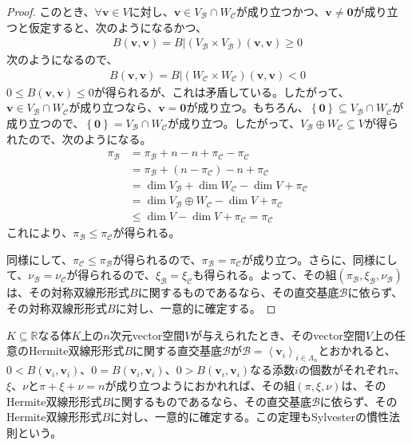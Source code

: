 \documentclass[dvipdfmx]{jsarticle}
\begin{document}
\begin{proof}
このとき、$\forall\mathbf{v} \in V$に対し、$\mathbf{v} \in V_{\mathcal{B}} \cap W_{\mathcal{C}}$が成り立つかつ、$\mathbf{v} \neq \mathbf{0}$が成り立つと仮定すると、次のようになるかつ、
\begin{align*}
B\left( \mathbf{v},\mathbf{v} \right) = B|\left( V_{\mathcal{B}} \times V_{\mathcal{B}} \right)\left( \mathbf{v},\mathbf{v} \right) \geq 0
\end{align*}
次のようになるので、
\begin{align*}
B\left( \mathbf{v},\mathbf{v} \right) = B|\left( W_{\mathcal{C}} \times W_{\mathcal{C}} \right)\left( \mathbf{v},\mathbf{v} \right) < 0
\end{align*}
$0 \leq B\left( \mathbf{v},\mathbf{v} \right) \leq 0$が得られるが、これは矛盾している。したがって、$\mathbf{v} \in V_{\mathcal{B}} \cap W_{\mathcal{C}}$が成り立つなら、$\mathbf{v} = \mathbf{0}$が成り立つ。もちろん、$\left\{ \mathbf{0} \right\} \subseteq V_{\mathcal{B}} \cap W_{\mathcal{C}}$が成り立つので、$\left\{ \mathbf{0} \right\} = V_{\mathcal{B}} \cap W_{\mathcal{C}}$が成り立つ。したがって、$V_{\mathcal{B}} \oplus W_{\mathcal{C}} \subseteq V$が得られたので、次のようになる。
\begin{align*}
\pi_{\mathcal{B}} &= \pi_{\mathcal{B}} + n - n + \pi_{\mathcal{C}} - \pi_{\mathcal{C}}\\
&= \pi_{\mathcal{B}} + \left( n - \pi_{\mathcal{C}} \right) - n + \pi_{\mathcal{C}}\\
&= \dim V_{\mathcal{B}} + \dim W_{\mathcal{C}} - \dim V + \pi_{\mathcal{C}}\\
&= \dim{V_{\mathcal{B}} \oplus W_{\mathcal{C}}} - \dim V + \pi_{\mathcal{C}}\\
&\leq \dim V - \dim V + \pi_{\mathcal{C}} = \pi_{\mathcal{C}}
\end{align*}
これにより、$\pi_{\mathcal{B}} \leq \pi_{\mathcal{C}}$が得られる。\par
同様にして、$\pi_{\mathcal{C}} \leq \pi_{\mathcal{B}}$が得られるので、$\pi_{\mathcal{B}} = \pi_{\mathcal{C}}$が成り立つ。さらに、同様にして、$\nu_{\mathcal{B}} = \nu_{\mathcal{C}}$が得られるので、$\xi_{\mathcal{B}} = \xi_{\mathcal{C}}$も得られる。よって、その組$\left( \pi_{\mathcal{B}},\xi_{\mathcal{B}},\nu_{\mathcal{B}} \right)$は、その対称双線形形式$B$に関するものであるなら、その直交基底$\mathcal{B}$に依らず、その対称双線形形式$B$に対し、一意的に確定する。
\end{proof}
\begin{thm}[Sylvesterの慣性法則]\label{2.3.5.20}
$K \subseteq \mathbb{R}$なる体$K$上の$n$次元vector空間$V$が与えられたとき、そのvector空間$V$上の任意のHermite双線形形式$B$に関する直交基底$\mathcal{B}$が$\mathcal{B} =\left\langle \mathbf{v}_{i} \right\rangle_{i \in \varLambda_{n}}$とおかれると、$0 < B\left( \mathbf{v}_{i},\mathbf{v}_{i} \right)$、$0 = B\left( \mathbf{v}_{i},\mathbf{v}_{i} \right)$、$0 > B\left( \mathbf{v}_{i},\mathbf{v}_{i} \right)$なる添数$i$の個数がそれぞれ$\pi$、$\xi$、$\nu$と$\pi + \xi + \nu = n$が成り立つようにおかれれば、その組$(\pi,\xi,\nu)$は、そのHermite双線形形式$B$に関するものであるなら、その直交基底$\mathcal{B}$に依らず、そのHermite双線形形式$B$に対し、一意的に確定する。この定理もSylvesterの慣性法則という。
\end{thm}
\end{document}
